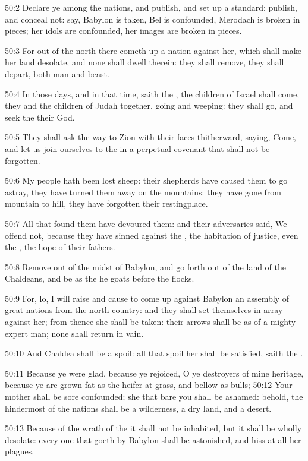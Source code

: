 50:2 Declare ye among the nations, and publish, and set up a standard; publish, and conceal not: say, Babylon is taken, Bel is confounded, Merodach is broken in pieces; her idols are confounded, her images are broken in pieces.

50:3 For out of the north there cometh up a nation against her, which shall make her land desolate, and none shall dwell therein: they shall remove, they shall depart, both man and beast.

50:4 In those days, and in that time, saith the \LORD, the children of Israel shall come, they and the children of Judah together, going and weeping: they shall go, and seek the \LORD their God.

50:5 They shall ask the way to Zion with their faces thitherward, saying, Come, and let us join ourselves to the \LORD in a perpetual covenant that shall not be forgotten.

50:6 My people hath been lost sheep: their shepherds have caused them to go astray, they have turned them away on the mountains: they have gone from mountain to hill, they have forgotten their restingplace.

50:7 All that found them have devoured them: and their adversaries said, We offend not, because they have sinned against the \LORD, the habitation of justice, even the \LORD, the hope of their fathers.

50:8 Remove out of the midst of Babylon, and go forth out of the land of the Chaldeans, and be as the he goats before the flocks.

50:9 For, lo, I will raise and cause to come up against Babylon an assembly of great nations from the north country: and they shall set themselves in array against her; from thence she shall be taken: their arrows shall be as of a mighty expert man; none shall return in vain.

50:10 And Chaldea shall be a spoil: all that spoil her shall be satisfied, saith the \LORD.

50:11 Because ye were glad, because ye rejoiced, O ye destroyers of mine heritage, because ye are grown fat as the heifer at grass, and bellow as bulls; 50:12 Your mother shall be sore confounded; she that bare you shall be ashamed: behold, the hindermost of the nations shall be a wilderness, a dry land, and a desert.

50:13 Because of the wrath of the \LORD it shall not be inhabited, but it shall be wholly desolate: every one that goeth by Babylon shall be astonished, and hiss at all her plagues.

